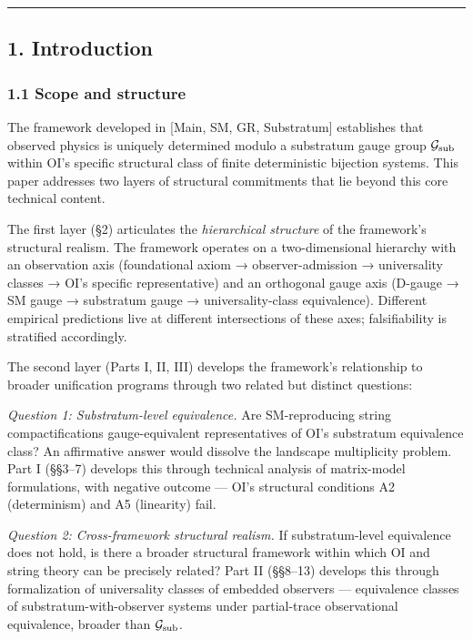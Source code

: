 \documentclass[
]{article}
\begin{document}
\begin{center}\rule{0.5\linewidth}{0.5pt}\end{center}

\hypertarget{introduction}{%
\subsection{1. Introduction}\label{introduction}}

\hypertarget{scope-and-structure}{%
\subsubsection{1.1 Scope and structure}\label{scope-and-structure}}

The framework developed in {[}Main, SM, GR, Substratum{]} establishes
that observed physics is uniquely determined modulo a substratum gauge
group \(\mathcal{G}_{\rm sub}\) within OI's specific structural class of
finite deterministic bijection systems. This paper addresses two layers
of structural commitments that lie beyond this core technical content.

The first layer (§2) articulates the \emph{hierarchical structure} of
the framework's structural realism. The framework operates on a
two-dimensional hierarchy with an observation axis (foundational axiom →
observer-admission → universality classes → OI's specific
representative) and an orthogonal gauge axis (D-gauge → SM gauge →
substratum gauge → universality-class equivalence). Different empirical
predictions live at different intersections of these axes;
falsifiability is stratified accordingly.

The second layer (Parts I, II, III) develops the framework's
relationship to broader unification programs through two related but
distinct questions:

\emph{Question 1: Substratum-level equivalence.} Are SM-reproducing
string compactifications gauge-equivalent representatives of OI's
substratum equivalence class? An affirmative answer would dissolve the
landscape multiplicity problem. Part I (§§3--7) develops this through
technical analysis of matrix-model formulations, with negative outcome
--- OI's structural conditions A2 (determinism) and A5 (linearity) fail.

\emph{Question 2: Cross-framework structural realism.} If
substratum-level equivalence does not hold, is there a broader
structural framework within which OI and string theory can be precisely
related? Part II (§§8--13) develops this through formalization of
universality classes of embedded observers --- equivalence classes of
substratum-with-observer systems under partial-trace observational
equivalence, broader than \(\mathcal{G}_{\rm sub}\).
\end{document}
